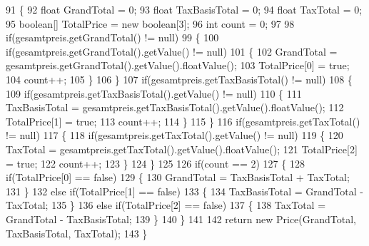 \begin{DoxyCode}
91     \{
92         \textcolor{keywordtype}{float} GrandTotal = 0;
93         \textcolor{keywordtype}{float} TaxBasisTotal = 0;
94         \textcolor{keywordtype}{float} TaxTotal = 0;
95         \textcolor{keywordtype}{boolean}[] TotalPrice = \textcolor{keyword}{new} \textcolor{keywordtype}{boolean}[3];
96         \textcolor{keywordtype}{int} count = 0;
97         
98         \textcolor{keywordflow}{if}(gesamtpreis.getGrandTotal() != null)
99         \{
100             \textcolor{keywordflow}{if}(gesamtpreis.getGrandTotal().getValue() != null)
101             \{
102                 GrandTotal = gesamtpreis.getGrandTotal().getValue().floatValue();
103                 TotalPrice[0] = \textcolor{keyword}{true};
104                 count++;
105             \}
106         \}
107         \textcolor{keywordflow}{if}(gesamtpreis.getTaxBasisTotal() != null)
108         \{
109             \textcolor{keywordflow}{if}(gesamtpreis.getTaxBasisTotal().getValue() != null)
110             \{
111                 TaxBasisTotal = gesamtpreis.getTaxBasisTotal().getValue().floatValue();
112                 TotalPrice[1] = \textcolor{keyword}{true};
113                 count++;
114             \}
115         \}
116         \textcolor{keywordflow}{if}(gesamtpreis.getTaxTotal() != null)
117         \{
118             \textcolor{keywordflow}{if}(gesamtpreis.getTaxTotal().getValue() != null)
119             \{
120                 TaxTotal = gesamtpreis.getTaxTotal().getValue().floatValue();
121                 TotalPrice[2] = \textcolor{keyword}{true};
122                 count++;
123             \}
124         \}
125         
126         \textcolor{keywordflow}{if}(count == 2)
127         \{
128             \textcolor{keywordflow}{if}(TotalPrice[0] == \textcolor{keyword}{false})
129             \{
130                 GrandTotal = TaxBasisTotal + TaxTotal;              
131             \}
132             \textcolor{keywordflow}{else} \textcolor{keywordflow}{if}(TotalPrice[1] == \textcolor{keyword}{false})
133             \{
134                 TaxBasisTotal = GrandTotal - TaxTotal;
135             \}
136             \textcolor{keywordflow}{else} \textcolor{keywordflow}{if}(TotalPrice[2] == \textcolor{keyword}{false})
137             \{
138                 TaxTotal = GrandTotal - TaxBasisTotal;
139             \}
140         \}
141         
142         \textcolor{keywordflow}{return} \textcolor{keyword}{new} Price(GrandTotal, TaxBasisTotal, TaxTotal);
143     \}
\end{DoxyCode}
